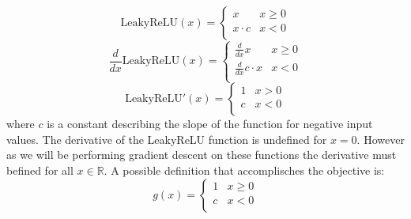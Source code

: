 \documentclass[12pt]{article}
\begin{document}
\begin{equation} \label{eq:NN:ReLU}
\text{LeakyReLU}(x) = \left\{
\begin{array}{ll}
x & x \ge 0 \\
x \cdot c & x < 0 \\
\end{array}
\right.
\end{equation}
\[
\frac{d}{dx} \text{LeakyReLU}(x) = \left\{
\begin{array}{ll}
\frac{d}{dx}x & x \ge 0 \\
\frac{d}{dx}c\cdot x & x < 0 \\
\end{array}
\right.
\]
\begin{equation} \label{eq:NN:Relu_derivative}
\text{LeakyReLU}'(x) = \left\{
\begin{array}{ll}
1 & x > 0 \\
c & x < 0 \\
\end{array}
\right.
\end{equation}
where \(c\) is a constant describing the slope of the function for negative input values. The derivative of the LeakyReLU function is undefined for \(x=0\). However as we will be performing gradient descent on these functions the derivative must befined for all \(x \in \mathbb R\). A possible definition that accomplisches the objective is:
\begin{equation}
g(x) = 
\begin{cases}
1 & x \ge 0\\
c & x < 0\\
\end{cases}
\end{equation}
\end{document}
